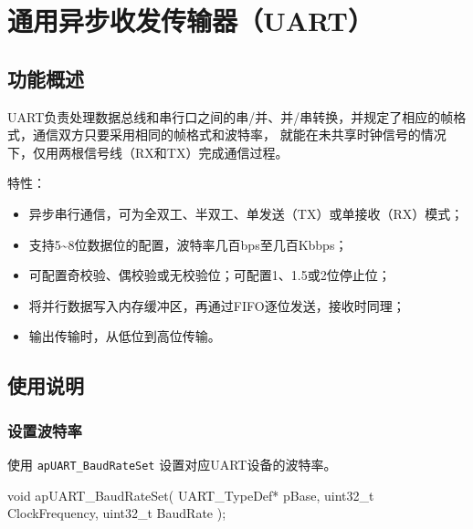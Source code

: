 \documentclass[
  12pt,
]{book}
\newenvironment{Shaded}{\begin{snugshade}}{\end{snugshade}}
\newcommand{\DataTypeTok}[1]{\textcolor[rgb]{0.13,0.29,0.53}{#1}}
\newcommand{\NormalTok}[1]{#1}
\providecommand{\tightlist}{%
  \setlength{\itemsep}{0pt}\setlength{\parskip}{0pt}}
\begin{document}
\hypertarget{ch-uart}{%
\chapter{通用异步收发传输器（UART）}\label{ch-uart}}

\hypertarget{ux529fux80fdux6982ux8ff0-6}{%
\section{功能概述}\label{ux529fux80fdux6982ux8ff0-6}}

UART负责处理数据总线和串行口之间的串/并、并/串转换，并规定了相应的帧格式，通信双方只要采用相同的帧格式和波特率，
就能在未共享时钟信号的情况下，仅用两根信号线（RX和TX）完成通信过程。

特性：

\begin{itemize}
\tightlist
\item
  异步串行通信，可为全双工、半双工、单发送（TX）或单接收（RX）模式；
\item
  支持5\textasciitilde8位数据位的配置，波特率几百bps至几百Kbbps；
\item
  可配置奇校验、偶校验或无校验位；可配置1、1.5或2位停止位；
\item
  将并行数据写入内存缓冲区，再通过FIFO逐位发送，接收时同理；
\item
  输出传输时，从低位到高位传输。
\end{itemize}

\hypertarget{ux4f7fux7528ux8bf4ux660e-7}{%
\section{使用说明}\label{ux4f7fux7528ux8bf4ux660e-7}}

\hypertarget{ux8bbeux7f6eux6ce2ux7279ux7387}{%
\subsection{设置波特率}\label{ux8bbeux7f6eux6ce2ux7279ux7387}}

使用 \texttt{apUART\_BaudRateSet} 设置对应UART设备的波特率。

\begin{Shaded}
\begin{Highlighting}[]
\DataTypeTok{void}\NormalTok{ apUART_BaudRateSet(}
\NormalTok{  UART_TypeDef* pBase, }
  \DataTypeTok{uint32_t}\NormalTok{ ClockFrequency, }
  \DataTypeTok{uint32_t}\NormalTok{ BaudRate}
\NormalTok{  );}
\end{Highlighting}
\end{Shaded}
\end{document}
